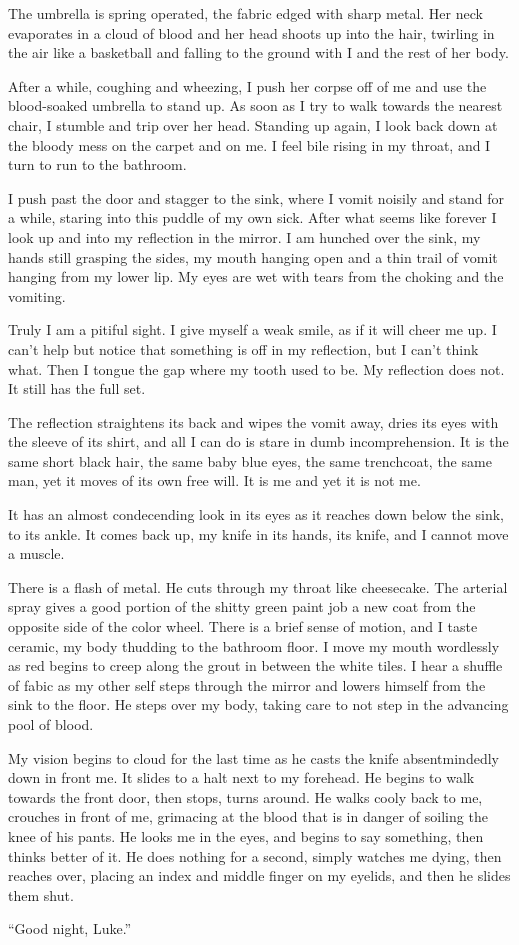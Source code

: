 The umbrella is spring operated, the fabric edged with sharp metal. Her
neck evaporates in a cloud of blood and her head shoots up into the
hair, twirling in the air like a basketball and falling to the ground
with I and the rest of her body.

After a while, coughing and wheezing, I push her corpse off of me and
use the blood-soaked umbrella to stand up. As soon as I try to walk
towards the nearest chair, I stumble and trip over her head. Standing up
again, I look back down at the bloody mess on the carpet and on me. I
feel bile rising in my throat, and I turn to run to the bathroom.

I push past the door and stagger to the sink, where I vomit noisily and
stand for a while, staring into this puddle of my own sick. After what
seems like forever I look up and into my reflection in the mirror. I am
hunched over the sink, my hands still grasping the sides, my mouth
hanging open and a thin trail of vomit hanging from my lower lip. My
eyes are wet with tears from the choking and the vomiting.

Truly I am a pitiful sight. I give myself a weak smile, as if it will
cheer me up. I can't help but notice that something is off in my
reflection, but I can't think what. Then I tongue the gap where my tooth
used to be. My reflection does not. It still has the full set.

The reflection straightens its back and wipes the vomit away, dries its
eyes with the sleeve of its shirt, and all I can do is stare in dumb
incomprehension. It is the same short black hair, the same baby blue
eyes, the same trenchcoat, the same man, yet it moves of its own free
will. It is me and yet it is not me.

It has an almost condecending look in its eyes as it reaches down below
the sink, to its ankle. It comes back up, my knife in its hands, its
knife, and I cannot move a muscle.

There is a flash of metal. He cuts through my throat like
cheesecake. The arterial spray gives a good portion of the shitty green
paint job a new coat from the opposite side of the color wheel. There is
a brief sense of motion, and I taste ceramic, my body thudding to the
bathroom floor. I move my mouth wordlessly as red begins to creep along
the grout in between the white tiles. I hear a shuffle of fabic as my
other self steps through the mirror and lowers himself from the sink to
the floor. He steps over my body, taking care to not step in the
advancing pool of blood.

My vision begins to cloud for the last time as he casts the knife
absentmindedly down in front me. It slides to a halt next to my
forehead. He begins to walk towards the front door, then stops, turns
around. He walks cooly back to me, crouches in front of me, grimacing at
the blood that is in danger of soiling the knee of his pants. He looks
me in the eyes, and begins to say something, then thinks better of
it. He does nothing for a second, simply watches me dying, then reaches
over, placing an index and middle finger on my eyelids, and then he
slides them shut.

``Good night, Luke.'' 

